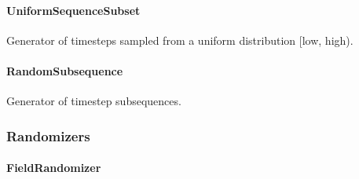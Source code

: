 \documentclass[letterpaper,10pt,english]{sphinxmanual}
\begin{document}
\paragraph{UniformSequenceSubset}
\label{\detokenize{api/datasets:uniformsequencesubset}}

\begin{fulllineitems}
\label{\detokenize{api/datasets:geology.datasets.UniformSequenceSubset}}
Generator of timesteps sampled from a uniform distribution {[}low, high).

\end{fulllineitems}



\paragraph{RandomSubsequence}
\label{\detokenize{api/datasets:randomsubsequence}}

\begin{fulllineitems}
\label{\detokenize{api/datasets:geology.datasets.RandomSubsequence}}
Generator of timestep subsequences.

\end{fulllineitems}



\subsubsection{Randomizers}
\label{\detokenize{api/randomizers:randomizers}}\label{\detokenize{api/randomizers::doc}}

\paragraph{FieldRandomizer}
\label{\detokenize{api/randomizers:fieldrandomizer}}
\end{document}
